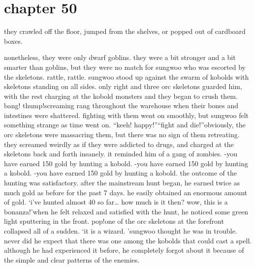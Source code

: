 \section{chapter 50}

                            they crawled off the floor, jumped from the shelves, or popped out of cardboard boxes.





nonetheless, they were only dwarf goblins.
 they were a bit stronger and a bit smarter than goblins, but they were no match for sungwoo who was escorted by the skeletons.
rattle, rattle.
sungwoo stood up against the swarm of kobolds with skeletons standing on all sides.
only right and three orc skeletons guarded him, with the rest charging at the kobold monsters and they began to crush them.
bang! thump!screaming rang throughout the warehouse when their bones and intestines were shattered.
fighting with them went on smoothly, but sungwoo felt something strange as time went on.
“keeh! happy!”“fight and die!”obviously, the orc skeletons were massacring them, but there was no sign of them retreating.
 they screamed weirdly as if they were addicted to drugs, and charged at the skeletons back and forth insanely.
 it reminded him of a gang of zombies.
-you have earned 150 gold by hunting a kobold.
-you have earned 150 gold by hunting a kobold.
-you have earned 150 gold by hunting a kobold.
the outcome of the hunting was satisfactory.
 after the mainstream hunt began, he earned twice as much gold as before for the past 7 days.
 he easily obtained an enormous amount of gold.
‘i’ve hunted almost 40 so far… how much is it then? wow, this is a bonanza!’when he felt relaxed and satisfied with the hunt, he noticed some green light sputtering in the front.
pop!one of the orc skeletons at the forefront collapsed all of a sudden.
‘it is a wizard.
’sungwoo thought he was in trouble.
 never did he expect that there was one among the kobolds that could cast a spell.
 although he had experienced it before, he completely forgot about it because of the simple and clear patterns of the enemies.

